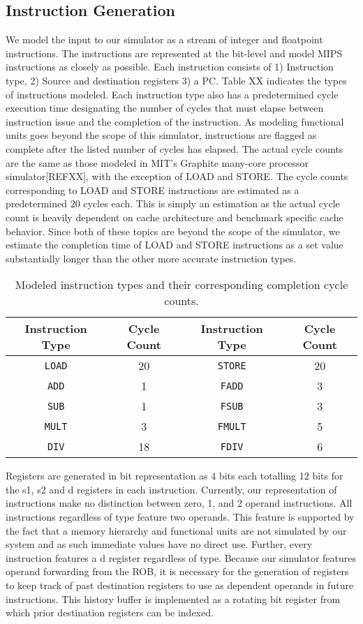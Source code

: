 \documentclass{acm_proc_article-sp}
\begin{document}
\subsection{Instruction Generation}
	We model the input to our simulator as a stream of integer and floatpoint instructions.  The instructions are represented at the bit-level and model MIPS instructions as closely as possible.  Each instruction consists of 1) Instruction type, 2) Source and destination registers 3) a PC.  Table XX indicates the types of instructions modeled.  Each instruction type also has a predetermined cycle execution time designating the number of cycles that must elapse between instruction issue and the completion of the instruction.  As modeling functional units goes beyond the scope of this simulator, instructions are flagged as complete after the listed number of cycles has elapsed.  The actual cycle counts are the same as those modeled in MIT's Graphite many-core processor simulator[REFXX], with the exception of LOAD and STORE.  The cycle counts corresponding to LOAD and STORE instructions are estimated as a predetermined 20 cycles each.  This is simply an estimation as the actual cycle count is heavily dependent on cache architecture and benchmark specific cache behavior.  Since both of these topics are beyond the scope of the simulator, we estimate the completion time of LOAD and STORE instructions as a set value substantially longer than the other more accurate instruction types.
\begin{table*}
\centering
\begin{tabular}{|c|c|c|c|} \hline
Instruction Type&Cycle Count&Instruction Type&Cycle Count\\ \hline
\texttt{LOAD}&20&\texttt{STORE}&20\\ \hline
\texttt{ADD}&1&\texttt{FADD}&3\\ \hline
\texttt{SUB}&1&\texttt{FSUB}&3\\ \hline
\texttt{MULT}&3&\texttt{FMULT}&5\\ \hline
\texttt{DIV}&18&\texttt{FDIV}&6\\ \hline\end{tabular}
\caption{Modeled instruction types and their corresponding completion cycle counts.}
\end{table*}
	Registers are generated in bit representation as 4 bits each totalling 12 bits for the s1, s2 and d registers in each instruction. Currently, our representation of instructions make no distinction between zero, 1, and 2 operand instructions.  All instructions regardless of type feature two operands.  This feature is supported by the fact that a memory hierarchy and functional units are not simulated by our system and as such immediate values have no direct use.  Further, every instruction features a d register regardless of type.  Because our simulator features operand forwarding from the ROB, it is necessary for the generation of registers to keep track of past destination registers to use as dependent operands in future instructions.  This history buffer is implemented as a rotating bit register from which prior destination registers can be indexed.
\end{document}
